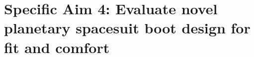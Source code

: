 \documentclass[defaultstyle,11pt]{comps}
\providecommand{\DIFaddtex}[1]{{\protect\color{blue}\uwave{#1}}} %
\providecommand{\DIFaddbegin}{} %
\providecommand{\DIFaddend}{} %
\providecommand{\DIFdelbegin}{} %
\providecommand{\DIFdelend}{} %
\providecommand{\DIFadd}[1]{\texorpdfstring{\DIFaddtex{#1}}{#1}} %
\newcommand{\DIFscaledelfig}{0.5}
\newlength{\DIFdelgraphicswidth} %
\newlength{\DIFdelgraphicsheight} %
\newcommand{\DIFaddincludegraphics}[2][]{{\color{blue}\fbox{\DIFOincludegraphics[#1]{#2}}}} %
\newcommand{\DIFdelincludegraphics}[2][]{%
\sbox{\DIFdelgraphicsbox}{\DIFOincludegraphics[#1]{#2}}%
\settoboxwidth{\DIFdelgraphicswidth}{\DIFdelgraphicsbox} %
\settoboxtotalheight{\DIFdelgraphicsheight}{\DIFdelgraphicsbox} %
\scalebox{\DIFscaledelfig}{%
\parbox[b]{\DIFdelgraphicswidth}{\usebox{\DIFdelgraphicsbox}\\[-\baselineskip] \rule{\DIFdelgraphicswidth}{0em}}\llap{\resizebox{\DIFdelgraphicswidth}{\DIFdelgraphicsheight}{%
\setlength{\unitlength}{\DIFdelgraphicswidth}%
\begin{picture}(1,1)%
\thicklines\linethickness{2pt} %
{\color[rgb]{1,0,0}\put(0,0){\framebox(1,1){}}}%
{\color[rgb]{1,0,0}\put(0,0){\line( 1,1){1}}}%
{\color[rgb]{1,0,0}\put(0,1){\line(1,-1){1}}}%
\end{picture}%
}\hspace*{3pt}}} %
} %
\DeclareRobustCommand{\DIFaddbegin}{\DIFOaddbegin \let\includegraphics\DIFaddincludegraphics} %
\DeclareRobustCommand{\DIFaddend}{\DIFOaddend \let\includegraphics\DIFOincludegraphics} %
\DeclareRobustCommand{\DIFdelbegin}{\DIFOdelbegin \let\includegraphics\DIFdelincludegraphics} %
\DeclareRobustCommand{\DIFdelend}{\DIFOaddend \let\includegraphics\DIFOincludegraphics} %
\begin{document}
{\DIFdelbegin %
\DIFdelend \DIFaddbegin \hypertarget{sec:SA4}{%
\chapter{Specific Aim 4: Evaluate novel planetary spacesuit boot design for fit and comfort}\label{sec:SA4}}
\DIFaddend 

\DIFdelbegin %


}
\end{document}
